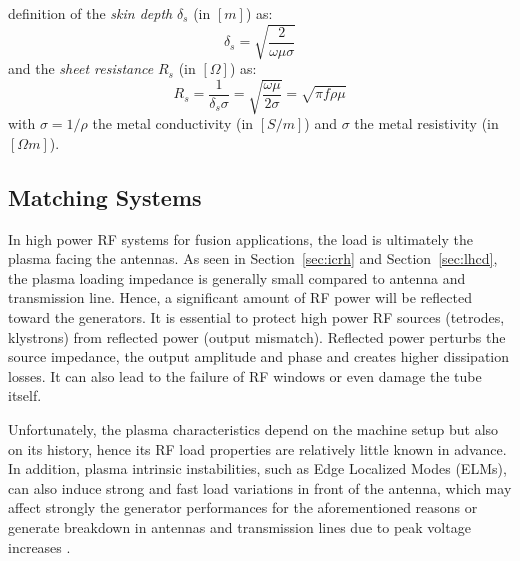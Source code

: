 definition of the \textit{skin depth} $\delta_s$ (in $[\si{m}]$) as:
\begin{equation}
\delta_s 
	=
	\sqrt{\frac{2}{\omega \mu \sigma}}
	\label{eq:skin_depth}
\end{equation}
and the \textit{sheet resistance} $R_s$ (in $[\si{\Omega}]$) as:
\begin{equation}
R_s 
	= 
	\frac{1}{\delta_s \sigma}
	=
	\sqrt{\frac{\omega\mu}{2\sigma}}
	=
	\sqrt{\pi f \rho \mu }
	\label{eq:sheet_resistance}
\end{equation}
with $\sigma=1/\rho$ the metal conductivity (in $[\si{S/m}]$) and $\sigma$ the metal resistivity (in $[\si{\Omega m}]$). 

\subsection{Matching Systems}\label{sec:matching_systems}
In high power RF systems for fusion applications, the load is ultimately the plasma facing the antennas. As seen in Section~\ref{sec:icrh} and Section~\ref{sec:lhcd}, the plasma loading impedance is generally small compared to antenna and transmission line. Hence, a significant amount of RF power will be reflected toward the generators. It is essential to protect high power RF sources (tetrodes, klystrons) from reflected power (output mismatch). Reflected power perturbs the source impedance, the output amplitude and phase and creates higher dissipation losses. It can also lead to the failure of RF windows  or even damage the tube itself. 

Unfortunately, the plasma characteristics depend on the machine setup but also on its history, hence its RF load properties are relatively little known in advance. In addition, plasma intrinsic instabilities, such as Edge Localized Modes (ELMs), can also induce strong and fast load variations in front of the antenna, which may affect strongly the generator performances for the aforementioned reasons or generate breakdown in antennas and transmission lines due to peak voltage increases . 

